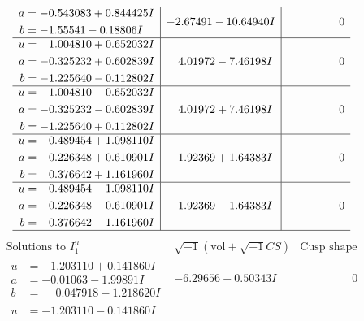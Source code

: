\documentclass[1p]{elsarticle_modified}
\theoremstyle{definition}
\newcommand{\I}{\sqrt{-1}}
\begin{document}
$$\begin{array}{c|c|c}
\begin{aligned}
a &= -0.543083 + 0.844425 I \\
b &= -1.55541 - 0.18806 I\end{aligned}
 & -2.67491 - 10.64940 I & \phantom{-0.000000 } 0 \\ \hline\begin{aligned}
u &= \phantom{-}1.004810 + 0.652032 I \\
a &= -0.325232 + 0.602839 I \\
b &= -1.225640 - 0.112802 I\end{aligned}
 & \phantom{-}4.01972 - 7.46198 I & \phantom{-0.000000 } 0 \\ \hline\begin{aligned}
u &= \phantom{-}1.004810 - 0.652032 I \\
a &= -0.325232 - 0.602839 I \\
b &= -1.225640 + 0.112802 I\end{aligned}
 & \phantom{-}4.01972 + 7.46198 I & \phantom{-0.000000 } 0 \\ \hline\begin{aligned}
u &= \phantom{-}0.489454 + 1.098110 I \\
a &= \phantom{-}0.226348 + 0.610901 I \\
b &= \phantom{-}0.376642 + 1.161960 I\end{aligned}
 & \phantom{-}1.92369 + 1.64383 I & \phantom{-0.000000 } 0 \\ \hline\begin{aligned}
u &= \phantom{-}0.489454 - 1.098110 I \\
a &= \phantom{-}0.226348 - 0.610901 I \\
b &= \phantom{-}0.376642 - 1.161960 I\end{aligned}
 & \phantom{-}1.92369 - 1.64383 I & \phantom{-0.000000 } 0\\
 \hline 
 \end{array}$$\newpage$$\begin{array}{c|c|c}  
\text{Solutions to }I^u_{1}& \I (\text{vol} + \sqrt{-1}CS) & \text{Cusp shape}\\
 \hline 
\begin{aligned}
u &= -1.203110 + 0.141860 I \\
a &= -0.01063 - 1.99891 I \\
b &= \phantom{-}0.047918 - 1.218620 I\end{aligned}
 & -6.29656 - 0.50343 I & \phantom{-0.000000 } 0 \\ \hline\begin{aligned}
u &= -1.203110 - 0.141860 I \\

\end{aligned}
\end{array}$$
\end{document}
